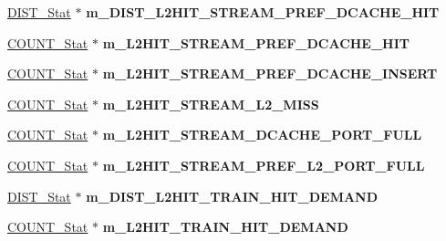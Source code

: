 \begin{DoxyCompactItemize}
\item 
\hypertarget{classall__stats__c_acb650c0009e6949e6c3b5daf39135d37}{
\hyperlink{classDIST__Stat}{DIST\_\-Stat} $\ast$ {\bfseries m\_\-DIST\_\-L2HIT\_\-STREAM\_\-PREF\_\-DCACHE\_\-HIT}}
\label{classall__stats__c_acb650c0009e6949e6c3b5daf39135d37}

\item 
\hypertarget{classall__stats__c_a04001305fabfa0de7118d9bd8f588a3b}{
\hyperlink{classCOUNT__Stat}{COUNT\_\-Stat} $\ast$ {\bfseries m\_\-L2HIT\_\-STREAM\_\-PREF\_\-DCACHE\_\-HIT}}
\label{classall__stats__c_a04001305fabfa0de7118d9bd8f588a3b}

\item 
\hypertarget{classall__stats__c_a96d940c1c5f93ab3036dc61bfee80004}{
\hyperlink{classCOUNT__Stat}{COUNT\_\-Stat} $\ast$ {\bfseries m\_\-L2HIT\_\-STREAM\_\-PREF\_\-DCACHE\_\-INSERT}}
\label{classall__stats__c_a96d940c1c5f93ab3036dc61bfee80004}

\item 
\hypertarget{classall__stats__c_aae5a4102da1aac4013d38001f240b96b}{
\hyperlink{classCOUNT__Stat}{COUNT\_\-Stat} $\ast$ {\bfseries m\_\-L2HIT\_\-STREAM\_\-L2\_\-MISS}}
\label{classall__stats__c_aae5a4102da1aac4013d38001f240b96b}

\item 
\hypertarget{classall__stats__c_a5d4c4e0a336b4886abe02b16a9d3effb}{
\hyperlink{classCOUNT__Stat}{COUNT\_\-Stat} $\ast$ {\bfseries m\_\-L2HIT\_\-STREAM\_\-DCACHE\_\-PORT\_\-FULL}}
\label{classall__stats__c_a5d4c4e0a336b4886abe02b16a9d3effb}

\item 
\hypertarget{classall__stats__c_ae9c9cc80fde1fb7904c360a1d808ee44}{
\hyperlink{classCOUNT__Stat}{COUNT\_\-Stat} $\ast$ {\bfseries m\_\-L2HIT\_\-STREAM\_\-PREF\_\-L2\_\-PORT\_\-FULL}}
\label{classall__stats__c_ae9c9cc80fde1fb7904c360a1d808ee44}

\item 
\hypertarget{classall__stats__c_ab1f9cdc5b6d4b49625727b1e4fc722df}{
\hyperlink{classDIST__Stat}{DIST\_\-Stat} $\ast$ {\bfseries m\_\-DIST\_\-L2HIT\_\-TRAIN\_\-HIT\_\-DEMAND}}
\label{classall__stats__c_ab1f9cdc5b6d4b49625727b1e4fc722df}

\item 
\hypertarget{classall__stats__c_a0d9fa25e77e86436856ce814f1951a94}{
\hyperlink{classCOUNT__Stat}{COUNT\_\-Stat} $\ast$ {\bfseries m\_\-L2HIT\_\-TRAIN\_\-HIT\_\-DEMAND}}
\label{classall__stats__c_a0d9fa25e77e86436856ce814f1951a94}


\end{DoxyCompactItemize}
